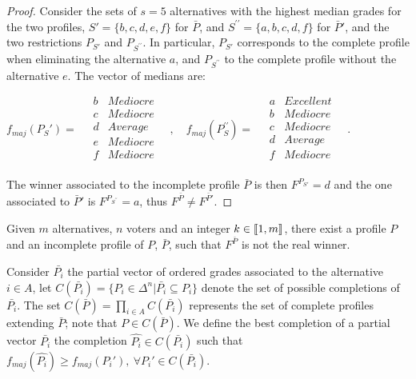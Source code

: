 \documentclass[version=3.21, pagesize, twoside=off, bibliography=totoc, DIV=calc, fontsize=12pt, a4paper]{scrartcl}
\begin{document}
\begin{proof}
	Consider the sets of $s=5$ alternatives with the highest median grades for the two profiles, $S'=\{b,c,d,e,f\}$ for $\bar{P}$, and $S^{\prime\prime}=\{a,b,c,d,f\}$ for $\bar{P}'$, and the two restrictions $P_{S'}$ and $P_{S^{\prime\prime}}$. In particular, $P_{S'}$ corresponds to the complete profile when eliminating the alternative $a$, and $P_{S^{\prime\prime}}$ to the complete profile without the alternative $e$.
	The vector of medians are:
	\begin{center}
		$f_{maj}(P_S')= \quad
		\begin{array}{cc}
			b &	Mediocre \\
			c &	Mediocre \\
			d &	Average	\\
			e &	Mediocre \\
			f & Mediocre \\
		\end{array} \quad,\quad%
		f_{maj}(P_S^{\prime\prime})= \quad
		\begin{array}{cc}
			a & Excellent \\
			b &	Mediocre \\
			c &	Mediocre \\
			d &	Average	\\
			f & Mediocre \\
		\end{array} \quad.
		$
	\end{center}
	The winner associated to the incomplete profile $\bar{P}$ is then $F^{P_{S'}} = d$ and the one associated to $\bar{P}'$ is $F^{P_{S^{\prime\prime}}} = a$, thus $F^{\bar{P}} \neq F^{\bar{P}'}$.
\end{proof}

\begin{corollary}
	Given $m$ alternatives, $n$ voters and an integer $k \in \llbracket1,m\rrbracket$, there exist a profile $P$ and an incomplete profile of $P$, $\bar{P}$, such that $F^{\bar{P}}$ is not the real winner.
\end{corollary}


Consider $\bar{P_i}$ the partial vector of ordered grades associated to the alternative $i\in A$, let $C(\bar{P_i}) = \{P_i \in \Delta^n | \bar{P_i} \subseteq P_i\}$ denote the set of possible completions of $\bar{P_i}$. The set $C(\bar{P}) = \prod_{i \in A} C(\bar{P_i})$ represents the set of complete profiles extending $\bar{P}$; note that $P \in C(\bar{P})$. We define the best completion of a partial vector $\bar{P_i}$ the completion $\hat{P_i}\in C(\bar{P_i})$ such that $f_{maj}(\hat{P_i})\geq f_{maj}(P_i'), \ \forall P_i' \in C(\bar{P_i})$.
\end{document}
